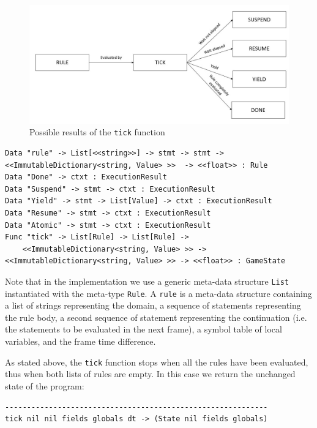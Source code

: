 \begin{figure}
	\centering
	\includegraphics[width=\textwidth]{Figures/tick}
	\caption{Possible results of the \texttt{tick} function}
	\label{fig:ch_mcnv_languages_tick_result}
\end{figure}

\begin{lstlisting}
Data "rule" -> List[<<string>>] -> stmt -> stmt -> <<ImmutableDictionary<string, Value> >>  -> <<float>> : Rule
Data "Done" -> ctxt : ExecutionResult
Data "Suspend" -> stmt -> ctxt : ExecutionResult
Data "Yield" -> stmt -> List[Value] -> ctxt : ExecutionResult
Data "Resume" -> stmt -> ctxt : ExecutionResult
Data "Atomic" -> stmt -> ctxt : ExecutionResult
Func "tick" -> List[Rule] -> List[Rule] -> 
	<<ImmutableDictionary<string, Value> >> -> <<ImmutableDictionary<string, Value> >> -> <<float>> : GameState   
\end{lstlisting}

\noindent
Note that in the implementation we use a generic meta-data structure \texttt{List} instantiated with the meta-type \texttt{Rule}. A \texttt{rule} is a meta-data structure containing a list of strings representing the domain, a sequence of statements representing the rule body, a second sequence of statement representing the continuation (i.e. the statements to be evaluated in the next frame), a symbol table of local variables, and the frame time difference.

As stated above, the \texttt{tick} function stops when all the rules have been evaluated, thus when both lists of rules are empty. In this case we return the unchanged state of the program:

\begin{lstlisting}
------------------------------------------------------------
tick nil nil fields globals dt -> (State nil fields globals)
\end{lstlisting}

